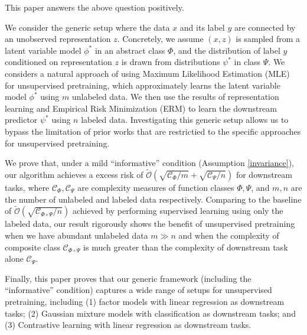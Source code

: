 This paper answers the above question positively.  

We consider the generic setup where the data $x$ and its label $y$ are connected by an unobserved representation $z$.  Concretely, we assume $(x,z)$ is sampled from a latent variable model $\phi^* $ in an abstract class $\Phi$, and the distribution of label $y$ conditioned on representation $z$ is drawn from distributions $\psi^* $ in class $\Psi$. We considers a natural approach of using Maximum Likelihood Estimation (MLE) for unsupervised pretraining, which approximately learns the latent variable model $\phi^* $ using $m$ unlabeled data. We then use the results of representation learning and Empirical Risk Minimization (ERM) to learn the downstream predictor $\psi^* $ using $n$ labeled data. Investigating this generic setup allows us to bypass the limitation of prior works that are restrictied to the specific approaches for unsupervised pretraining.

We prove that, under a mild ``informative'' condition (Assumption \ref{invariance}), our algorithm achieves a excess risk of $\tilde{\mathcal{O}}(\sqrt{\mathcal{C}_\Phi/m} + \sqrt{\mathcal{C}_\Psi/n})$ for downstream tasks, where $\mathcal{C}_\Phi, \mathcal{C}_\Psi$ are complexity measures of function classes $\Phi, \Psi$, and $m, n$ are the number of unlabeled and labeled data respectively. Comparing to the baseline of $\tilde{\mathcal{O}}(\sqrt{\mathcal{C}_{\Phi \circ \Psi}/n})$ achieved by performing supervised learning using only the labeled data, our result rigorously shows the benefit of unsupervised pretraining when we have abundant unlabeled data $m \gg n$ and when the complexity of composite class $\mathcal{C}_{\Phi\circ \Psi}$ is much greater than the complexity of downstream task alone $\mathcal{C}_\Psi$.

Finally, this paper proves that our generic framework (including the ``informative'' condition) captures a wide range of setups for unsupervised pretraining, including (1) factor models with linear regression as downstream tasks; (2) Gaussian mixture models with classification as downstream tasks; and (3) Contrastive learning with linear regression as downstream tasks.



